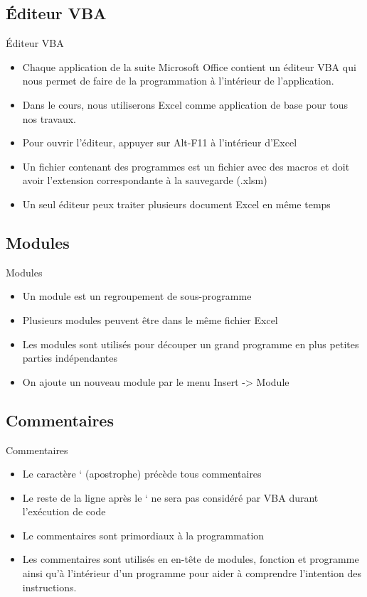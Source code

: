 \documentclass[aspectratio=169,usenames,dvipsnames]{beamer}
\begin{document}
    \subsection{Éditeur VBA}
    \begin{frame}{Éditeur VBA}
        \begin{itemize}
            \item Chaque application de la suite Microsoft Office contient un éditeur VBA qui nous permet de faire de la programmation à l’intérieur de l’application.
            \item Dans le cours, nous utiliserons Excel comme application de base pour tous nos travaux.
            \item Pour ouvrir l’éditeur, appuyer sur \alert{Alt-F11} à l’intérieur d’Excel
            \item Un fichier contenant des programmes est un fichier avec des macros et doit avoir l’extension correspondante à la sauvegarde (\alert{.xlsm})
            \item Un seul éditeur peux traiter plusieurs document Excel en même temps
        \end{itemize}
    \end{frame}
    \subsection{Modules}
    \begin{frame}{Modules}
        \begin{itemize}
            \item Un module est un regroupement de sous-programme
            \item Plusieurs modules peuvent être dans le même fichier Excel
            \item Les modules sont utilisés pour découper un grand programme en plus petites parties indépendantes
            \item On ajoute un nouveau module par le menu \alert{Insert -> Module}
        \end{itemize}
    \end{frame}
    \subsection{Commentaires}
    \begin{frame}{Commentaires}
        \begin{itemize}
            \item Le caractère \alert{‘} (apostrophe) précède tous commentaires
            \item Le reste de la ligne après le ‘ ne sera pas considéré par VBA durant l’exécution de code
            \item Le commentaires sont primordiaux à la programmation
            \item Les commentaires sont utilisés en en-tête de modules, fonction et programme ainsi qu’à l’intérieur d’un programme pour aider à comprendre l’intention des instructions.
        \end{itemize}
    \end{frame}
\end{document}
